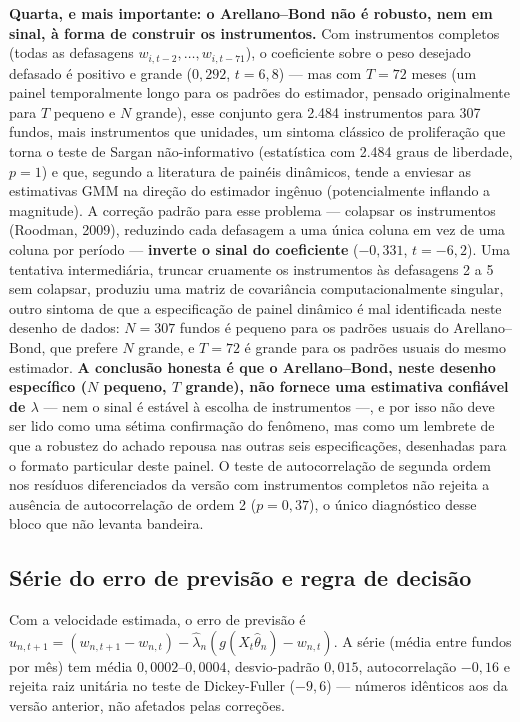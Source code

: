 \documentclass[12pt,a4paper]{article}
\begin{document}
\textbf{Quarta, e mais importante: o Arellano--Bond não é robusto, nem em sinal, à forma de
construir os instrumentos.} Com instrumentos completos (todas as defasagens $w_{i,t-2},\dots,
w_{i,t-71}$), o coeficiente sobre o peso desejado defasado é positivo e grande ($0{,}292$,
$t=6{,}8$) --- mas com $T=72$ meses (um painel temporalmente longo para os padrões do estimador,
pensado originalmente para $T$ pequeno e $N$ grande), esse conjunto gera 2.484 instrumentos para
307 fundos, mais instrumentos que unidades, um sintoma clássico de proliferação que torna o
teste de Sargan não-informativo (estatística com 2.484 graus de liberdade, $p=1$) e que, segundo
a literatura de painéis dinâmicos, tende a enviesar as estimativas GMM na direção do estimador
ingênuo (potencialmente inflando a magnitude). A correção padrão para esse problema --- colapsar
os instrumentos (Roodman, 2009), reduzindo cada defasagem a uma única coluna em vez de uma coluna
por período --- \textbf{inverte o sinal do coeficiente} ($-0{,}331$, $t=-6{,}2$). Uma tentativa
intermediária, truncar cruamente os instrumentos às defasagens 2 a 5 sem colapsar, produziu uma
matriz de covariância computacionalmente singular, outro sintoma de que a especificação de
painel dinâmico é mal identificada neste desenho de dados: $N=307$ fundos é pequeno para os
padrões usuais do Arellano--Bond, que prefere $N$ grande, e $T=72$ é grande para os padrões
usuais do mesmo estimador. \textbf{A conclusão honesta é que o Arellano--Bond, neste desenho
específico ($N$ pequeno, $T$ grande), não fornece uma estimativa confiável de $\lambda$} --- nem
o sinal é estável à escolha de instrumentos ---, e por isso não deve ser lido como uma sétima
confirmação do fenômeno, mas como um lembrete de que a robustez do achado repousa nas outras seis
especificações, desenhadas para o formato particular deste painel. O teste de autocorrelação de
segunda ordem nos resíduos diferenciados da versão com instrumentos completos não rejeita a
ausência de autocorrelação de ordem 2 ($p=0{,}37$), o único diagnóstico desse bloco que não
levanta bandeira.

\subsection{Série do erro de previsão e regra de decisão}
\label{sec:decis}

Com a velocidade estimada, o erro de previsão é $\widehat{u}_{n,t+1} = (w_{n,t+1}-w_{n,t}) -
\widehat{\lambda}_n(g(X_t\widehat{\theta}_n)-w_{n,t})$. A série (média entre fundos por mês) tem
média $0{,}0002$--$0{,}0004$, desvio-padrão $0{,}015$, autocorrelação $-0{,}16$ e rejeita raiz
unitária no teste de Dickey-Fuller ($-9{,}6$) --- números idênticos aos da versão anterior, não
afetados pelas correções.
\end{document}

